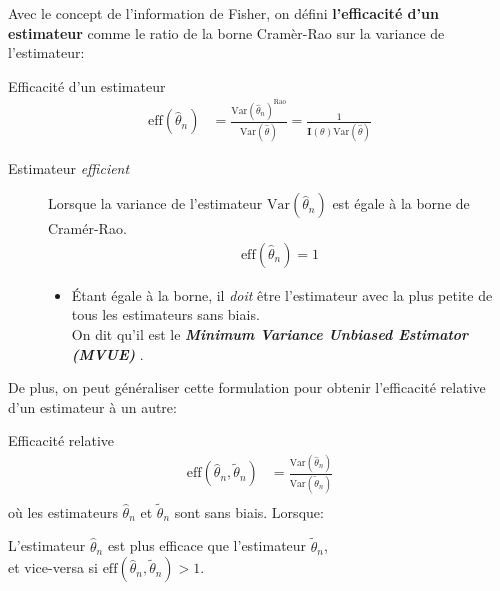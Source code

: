 \documentclass[10pt, french]{article}
\begin{document}
\begin{multicols*}{2}
Avec le concept de l'information de Fisher, on défini \textbf{l'efficacité d'un estimateur} comme le ratio de la borne Cramèr-Rao sur la variance de l'estimateur:
\begin{algo}{Efficacité d'un estimateur}
\begin{align*}
	\text{eff}(\hat{\theta}_{n})
	&=	\frac{\text{Var}(\hat{\theta}_{n})^{\text{Rao}}}{\text{Var}(\hat{\theta})} 
	=	\frac{1}{\bm{I}(\theta)\text{Var}(\hat{\theta})}
\end{align*}
\tcbline
\begin{description}
	\item[Estimateur \og \textit{efficient} \fg{}]	Lorsque la variance de l'estimateur $\text{Var}(\hat{\theta}_{n})$ est égale à la borne de Cramér-Rao.
		\begin{align*}
		\text{eff}(\hat{\theta}_{n}) = 1
		\end{align*}
	\begin{itemize}[leftmargin = *]
	\item	Étant égale à la borne, il \textit{doit} être l'estimateur avec la plus petite de tous les estimateurs sans biais.\\
	 		On dit qu'il est le \og \textbf{\textit{Minimum Variance Unbiased Estimator (MVUE)}} \fg{}. 
	\end{itemize}
\end{description}
\end{algo}

De plus, on peut généraliser cette formulation pour obtenir l'efficacité relative d'un estimateur à un autre:
\begin{algo}{Efficacité relative}
\begin{align*}
	\text{eff}(\hat\theta_{n}, \tilde\theta_{n})
	&=	\frac{\text{Var}(\hat\theta_{n})}{\text{Var}(\tilde\theta_{n})}		\\
\end{align*}
où les estimateurs $\hat\theta_{n}$ et $\tilde\theta_{n}$ sont sans biais.
\tcbline
Lorsque:
\begin{description}[font = \normalfont]
	\item[$\text{eff}(\hat\theta_{n}, \tilde\theta_{n}) < 1$:]	L'estimateur $\hat{\theta}_{n}$ est plus efficace que l'estimateur $\tilde{\theta}_{n}$, \\
	et vice-versa si $\text{eff}(\hat\theta_{n}, \tilde\theta_{n}) > 1$.
\end{description}
\end{algo}

\columnbreak


\end{multicols*}
\end{document}
